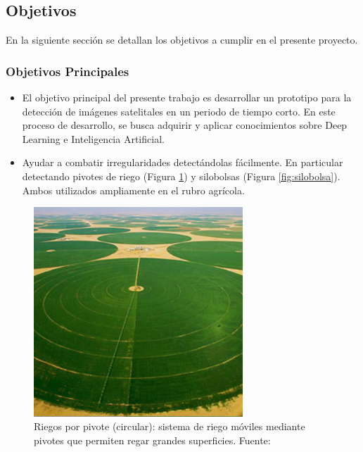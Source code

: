 \subsection{Objetivos}
En la siguiente sección se detallan los objetivos a cumplir en el presente proyecto.
\subsubsection{Objetivos Principales}
\begin{itemize}
    \item El objetivo principal del presente trabajo es desarrollar un prototipo para la detección de imágenes satelitales en un periodo de tiempo corto. En este proceso de desarrollo, se busca adquirir y aplicar conocimientos sobre Deep Learning e Inteligencia Artificial.\\
    
    \item Ayudar a combatir irregularidades detectándolas fácilmente. En particular detectando pivotes de riego (Figura \ref{fig:pivot}) y silobolsas (Figura \ref{fig:silobolsa}). Ambos utilizados ampliamente en el rubro agrícola.
\end{itemize}

    \begin{figure}
        \centering
        \includegraphics[width=0.7\textwidth]{img/pivot.png}
        \caption{Riegos por pivote (circular): sistema de riego móviles mediante pivotes que permiten regar grandes superficies. Fuente: \cite{img_pivot}}
        \label{fig:pivot}
    \end{figure}
    

